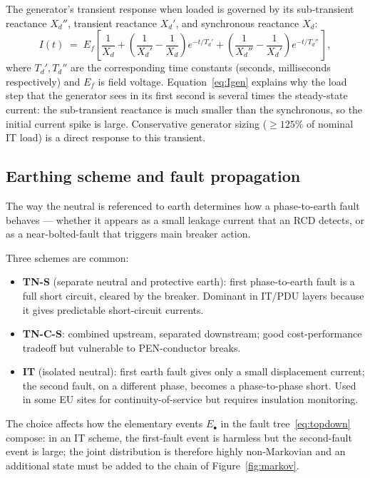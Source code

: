 The generator's transient response when loaded is governed by its
sub-transient reactance $X_d''$, transient reactance $X_d'$, and
synchronous reactance $X_d$:
\begin{equation}\label{eq:Igen}
   I(t) \;=\; E_f \left[
   \frac{1}{X_d} + \left(\frac{1}{X_d'}-\frac{1}{X_d}\right)e^{-t/T_d'}
            + \left(\frac{1}{X_d''}-\frac{1}{X_d'}\right)e^{-t/T_d''}\,\right],
\end{equation}
where $T_d', T_d''$ are the corresponding time constants
(seconds, milliseconds respectively) and $E_f$ is field voltage.
Equation~\eqref{eq:Igen} explains why the load step that the generator
sees in its first second is several times the steady-state current:
the sub-transient reactance is much smaller than the synchronous, so
the initial current spike is large. Conservative generator sizing
($\geq 125\%$ of nominal IT load) is a direct response to this transient.

\subsection{Earthing scheme and fault propagation}\label{ss:earth}

The way the neutral is referenced to earth determines how a phase-to-earth
fault behaves --- whether it appears as a small leakage current that an
RCD detects, or as a near-bolted-fault that triggers main breaker action.

Three schemes are common:
\begin{itemize}[leftmargin=*,nosep]
  \item \textbf{TN-S} (separate neutral and protective earth):
        first phase-to-earth fault is a full short circuit, cleared by
        the breaker. Dominant in IT/PDU layers because it gives
        predictable short-circuit currents.
  \item \textbf{TN-C-S}: combined upstream, separated downstream;
        good cost-performance tradeoff but vulnerable to PEN-conductor breaks.
  \item \textbf{IT} (isolated neutral): first earth fault gives only a
        small displacement current; the second fault, on a different
        phase, becomes a phase-to-phase short. Used in some EU sites
        for continuity-of-service but requires insulation monitoring.
\end{itemize}
The choice affects how the elementary events $E_\bullet$ in the
fault tree~\eqref{eq:topdown} compose: in an IT scheme, the first-fault
event is harmless but the second-fault event is large; the joint
distribution is therefore highly non-Markovian and an additional state
must be added to the chain of Figure~\ref{fig:markov}.


